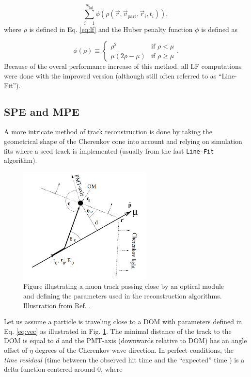 \begin{equation}
\sum^{N_{\textrm{hit}}}_{i=1} \phi(\rho(\vec{r},\vec{v}_\textrm{part},\vec{r}_i,t_i)),
\end{equation}
\noindent where $\rho$ is defined in Eq. \ref{eq:lf} and the Huber penalty function $\phi$ is defined as

\begin{equation}
\phi(\rho) \equiv \left\{
    \begin{array}{ll}
        \rho^2 &\textrm{if } \rho < \mu \\
        \mu\left(2\rho - \mu\right) & \textrm{if }\rho \geq \mu
    \end{array}
    \right.
    .
\end{equation}
\noindent Because of the overal performance increase of this method, all LF computations were done with the improved version (although still often referred to as ``Line-Fit'').

\subsection{SPE and MPE}
\label{subsec:spempe}
A more intricate method of track reconstruction is done by taking the geometrical shape of the Cherenkov cone into account and relying on simulation fits where a seed track is implemented (usually from the fast \texttt{Line-Fit} algorithm).


\begin{figure}
\centering
\includegraphics[width=0.6\textwidth]{chapter7/img/reconstruction.png}
\caption{Figure illustrating a muon track passing close by an optical module and defining the parameters used in the reconstruction algorithms. Illustration from Ref. \cite{Ahrens:2003fg}.}
\label{fig:reconstruction}
\end{figure}

Let us assume a particle is traveling close to a DOM with parameters defined in Eq. \ref{eq:vec} as illustrated in Fig. \ref{fig:reconstruction}. The minimal distance of the track to the DOM is equal to $d$ and the PMT-axis (downwards relative to DOM) has an angle offset of $\eta$ degrees of the Cherenkov wave direction. In perfect conditions, the \textit{time residual} (time between the observed hit time and the ``expected'' time ) is a delta function centered around 0, where

